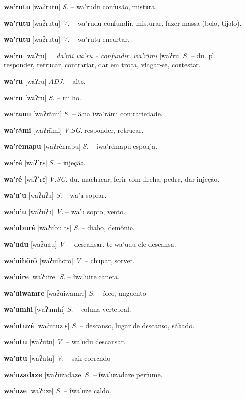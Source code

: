 \textbf{wa'rutu} [waʔrutu] \textit{S.} -- wa'rudu confusão, mistura.

\textbf{wa'rutu} [waʔrutu] \textit{V.} -- wa'rudu confundir, misturar, fazer massa (bolo, tijolo).

\textbf{wa'rutu} [waʔrutu] \textit{V.} -- wa'rutu encurtar.

\textbf{wa'ru} [waʔru] \textit{= da'rãi wa'ru -- confundir. wa'rãmi} [waʔru] \textit{S.} -- du. pl. responder, retrucar, contrariar, dar em troca, vingar-se, contestar.

\textbf{wa'ru} [waʔru] \textit{ADJ.} -- alto.

\textbf{wa'ru} [waʔru] \textit{S.} -- milho.

\textbf{wa'rãmi} [waʔrãmi] \textit{S.} -- ãma ĩwa'rãmi contrariedade.

\textbf{wa'rãmi} [waʔrãmi] \textit{V.SG.} responder, retrucar.

\textbf{wa'rémapu} [waʔrémapu] \textit{S.} -- ĩwa'rémapu esponja.

\textbf{wa'ré} [waʔˈrɛ] \textit{S.} -- injeção.

\textbf{wa'ré} [waʔˈrɛ] \textit{V.SG.} du. machucar, ferir com flecha, pedra, dar injeção.

\textbf{wa'u'u} [waʔuʔu] \textit{S.} -- wa'u soprar.

\textbf{wa'u'u} [waʔuʔu] \textit{V.} -- wa'u sopro, vento.

\textbf{wa'uburé} [waʔubuˈrɛ] \textit{S.} -- diabo, demônio.

\textbf{wa'udu} [waʔudu] \textit{V.} -- descansar. te wa'udu ele descansa.

\textbf{wa'uihörö} [waʔuihörö] \textit{V.} -- chupar, sorver.

\textbf{wa'uire} [waʔuire] \textit{S.} -- ĩwa'uire caneta.

\textbf{wa'uiwamre} [waʔuiwamre] \textit{S.} -- óleo, unguento.

\textbf{wa'umhi} [waʔumhi] \textit{S.} -- coluna vertebral.

\textbf{wa'utuzé} [waʔutuzˈɛ] \textit{S.} -- descanso, lugar de descanso, sábado.

\textbf{wa'utu} [waʔutu] \textit{V.} -- wa'udu descansar.

\textbf{wa'utu} [waʔutu] \textit{V.} -- {sair correndo}

\textbf{wa'uzadaze} [waʔuzadaze] \textit{S.} -- ĩwa'uzadaze perfume.

\textbf{wa'uze} [waʔuze] \textit{S.} -- ĩwa'uze caldo.

